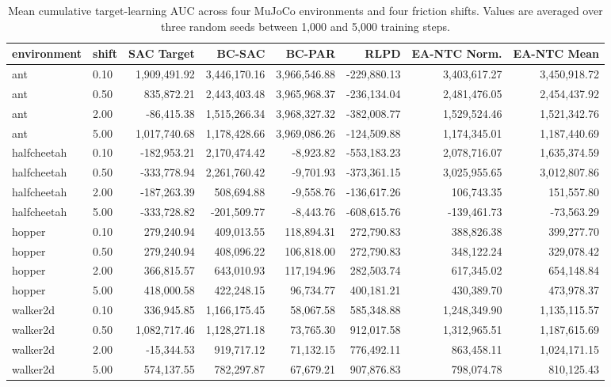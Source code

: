 \begin{table}
\centering
\caption{Mean cumulative target-learning AUC across four MuJoCo environments and four friction shifts. Values are averaged over three random seeds between 1,000 and 5,000 training steps.}
\label{tab:rq2_auc_all_algorithms}
\begin{tabular}{llrrrrrr}
\toprule
environment &  shift &   SAC Target &       BC-SAC &       BC-PAR &        RLPD &  EA-NTC Norm. &  EA-NTC Mean \\
\midrule
        ant &   0.10 & 1,909,491.92 & 3,446,170.16 & 3,966,546.88 & -229,880.13 &  3,403,617.27 & 3,450,918.72 \\
        ant &   0.50 &   835,872.21 & 2,443,403.48 & 3,965,968.37 & -236,134.04 &  2,481,476.05 & 2,454,437.92 \\
        ant &   2.00 &   -86,415.38 & 1,515,266.34 & 3,968,327.32 & -382,008.77 &  1,529,524.46 & 1,521,342.76 \\
        ant &   5.00 & 1,017,740.68 & 1,178,428.66 & 3,969,086.26 & -124,509.88 &  1,174,345.01 & 1,187,440.69 \\
halfcheetah &   0.10 &  -182,953.21 & 2,170,474.42 &    -8,923.82 & -553,183.23 &  2,078,716.07 & 1,635,374.59 \\
halfcheetah &   0.50 &  -333,778.94 & 2,261,760.42 &    -9,701.93 & -373,361.15 &  3,025,955.65 & 3,012,807.86 \\
halfcheetah &   2.00 &  -187,263.39 &   508,694.88 &    -9,558.76 & -136,617.26 &    106,743.35 &   151,557.80 \\
halfcheetah &   5.00 &  -333,728.82 &  -201,509.77 &    -8,443.76 & -608,615.76 &   -139,461.73 &   -73,563.29 \\
     hopper &   0.10 &   279,240.94 &   409,013.55 &   118,894.31 &  272,790.83 &    388,826.38 &   399,277.70 \\
     hopper &   0.50 &   279,240.94 &   408,096.22 &   106,818.00 &  272,790.83 &    348,122.24 &   329,078.42 \\
     hopper &   2.00 &   366,815.57 &   643,010.93 &   117,194.96 &  282,503.74 &    617,345.02 &   654,148.84 \\
     hopper &   5.00 &   418,000.58 &   422,248.15 &    96,734.77 &  400,181.21 &    430,389.70 &   473,978.37 \\
   walker2d &   0.10 &   336,945.85 & 1,166,175.45 &    58,067.58 &  585,348.88 &  1,248,349.90 & 1,135,115.57 \\
   walker2d &   0.50 & 1,082,717.46 & 1,128,271.18 &    73,765.30 &  912,017.58 &  1,312,965.51 & 1,187,615.69 \\
   walker2d &   2.00 &   -15,344.53 &   919,717.12 &    71,132.15 &  776,492.11 &    863,458.11 & 1,024,171.15 \\
   walker2d &   5.00 &   574,137.55 &   782,297.87 &    67,679.21 &  907,876.83 &    798,074.78 &   810,125.43 \\
\bottomrule
\end{tabular}
\end{table}
